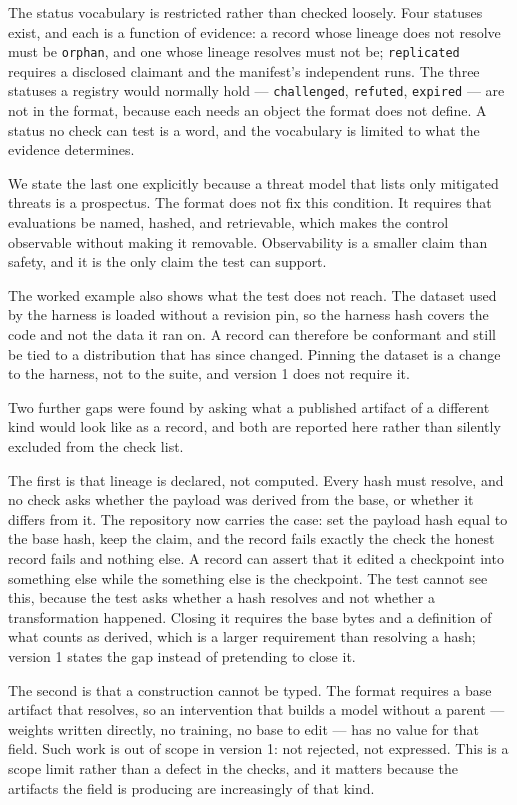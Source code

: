 \documentclass[11pt]{article}
\begin{document}
The status vocabulary is restricted rather than checked loosely. Four statuses
exist, and each is a function of evidence: a record whose lineage does not
resolve must be \texttt{orphan}, and one whose lineage resolves must not be; \texttt{replicated}
requires a disclosed claimant and the manifest's independent runs. The three
statuses a registry would normally hold --- \texttt{challenged}, \texttt{refuted}, \texttt{expired} ---
are not in the format, because each needs an object the format does not define.
A status no check can test is a word, and the vocabulary is limited to what the
evidence determines.

We state the last one explicitly because a threat model that lists only
mitigated threats is a prospectus. The format does not fix this condition. It
requires that evaluations be named, hashed, and retrievable, which makes the
control observable without making it removable. Observability is a smaller
claim than safety, and it is the only claim the test can support.

The worked example also shows what the test does not reach. The dataset used by
the harness is loaded without a revision pin, so the harness hash covers the
code and not the data it ran on. A record can therefore be conformant and still
be tied to a distribution that has since changed. Pinning the dataset is a
change to the harness, not to the suite, and version 1 does not require it.

Two further gaps were found by asking what a published artifact of a different
kind would look like as a record, and both are reported here rather than
silently excluded from the check list.

The first is that lineage is declared, not computed. Every hash must resolve,
and no check asks whether the payload was derived from the base, or whether it
differs from it. The repository now carries the case: set the payload hash equal
to the base hash, keep the claim, and the record fails exactly the check the
honest record fails and nothing else. A record can assert that it edited a
checkpoint into something else while the something else is the checkpoint. The
test cannot see this, because the test asks whether a hash resolves and not
whether a transformation happened. Closing it requires the base bytes and a
definition of what counts as derived, which is a larger requirement than
resolving a hash; version 1 states the gap instead of pretending to close it.

The second is that a construction cannot be typed. The format requires a base
artifact that resolves, so an intervention that builds a model without a parent
--- weights written directly, no training, no base to edit --- has no value for
that field. Such work is out of scope in version 1: not rejected, not expressed.
This is a scope limit rather than a defect in the checks, and it matters because
the artifacts the field is producing are increasingly of that kind.
\end{document}
